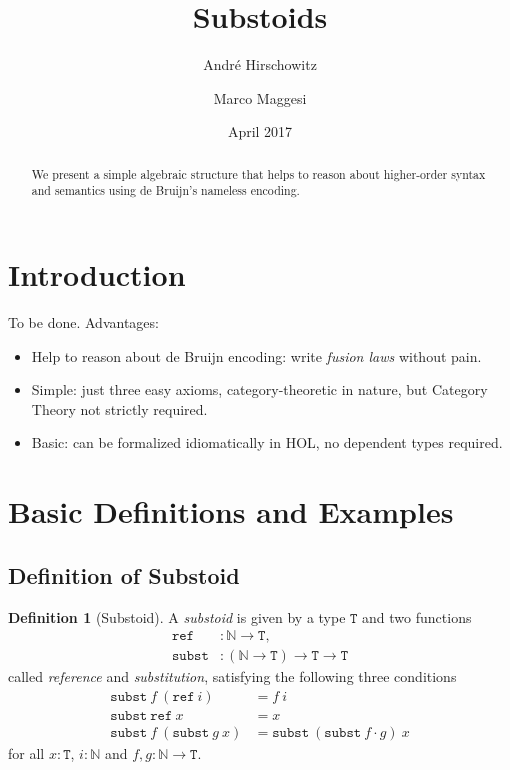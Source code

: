 \documentclass[a4paper,twoside,12pt]{article}
\title{Substoids}
\author{Andr\'e Hirschowitz \and Marco Maggesi}
\date{April 2017}
\theoremstyle{definition}
\newtheorem{definition}{Definition}
\theoremstyle{remark}
\newcommand{\NN}{\mathbb{N}}
\newcommand{\subst}{\mathtt{subst}}
\newcommand{\refe}{\mathtt{ref}}
\newcommand{\TT}{\mathtt{T}}
\begin{document}
\maketitle

\begin{abstract}
  We present a simple algebraic structure that helps to reason about
  higher-order syntax and semantics using de Bruijn's nameless
  encoding.
\end{abstract}

\section{Introduction}
\label{sec:intro}
To be done.
Advantages:
\begin{itemize}
\item Help to reason about de Bruijn encoding: write \emph{fusion
    laws} without pain.
\item Simple: just three easy axioms, category-theoretic in nature,
  but Category Theory not strictly required.
\item Basic: can be formalized idiomatically in HOL, no dependent
  types required.
\end{itemize}

\section{Basic Definitions and Examples}
\label{sec:basic-def}

\subsection{Definition of Substoid}
\label{sec:basic-defin-example}

\begin{definition}[Substoid]
  A \emph{substoid} is given by a type $\TT$ and two functions
  \begin{align*}
    \mathtt{ref} &\colon \NN \to \TT, \\
    \mathtt{subst} &\colon (\NN \to \TT) \to \TT \to \TT
  \end{align*}
  called \emph{reference} and \emph{substitution}, satisfying the
  following three conditions
  \begin{align*}
    \subst\ f\ (\refe\ i) &=  f\ i \\
    \subst\ \refe\ x &=  x \\
    \subst\ f\ (\subst\ g\ x) &= \subst\ (\subst\ f \cdot g)\ x
  \end{align*}
  for all $x : \TT$, $i :\NN$ and $f,g\colon \NN \to \TT$.
\end{definition}
\end{document}
